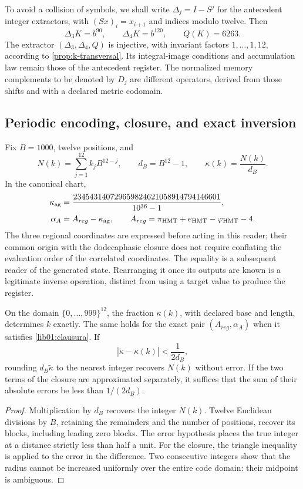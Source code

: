 To avoid a collision of symbols, we shall write \(\Delta_j=I-S^j\) for the antecedent integer extractors, with \((Sx)_i=x_{i+1}\) and indices modulo twelve. Then
\[
 \Delta_3K=b^{90},\qquad \Delta_4K=b^{120},\qquad Q(K)=6263.
\]
The extractor \((\Delta_3,\Delta_4,Q)\) is injective, with invariant factors \(1,\ldots,1,12\), according to \cref{prop:k-transversal}. Its integral-image conditions and accumulation law remain those of the antecedent register. The normalized memory complements to be denoted by \(D_j\) are different operators, derived from those shifts and with a declared metric codomain.

\subsection{Periodic encoding, closure, and exact inversion}
\label{lib01:kappa}

Fix \(B=1000\), twelve positions, and
\[
 N(k)=\sum_{j=1}^{12}k_jB^{12-j},\qquad d_B=B^{12}-1,
 \qquad \kappa(k)=\frac{N(k)}{d_B}.
\]
In the canonical chart,
\begin{equation}
 \begin{aligned}
 \kappa_{\rm ag}
 &=\frac{234543140729659824621058914794146601}{10^{36}-1},\\
 \alpha_A&=A_{reg}-\kappa_{\rm ag},\qquad
 A_{reg}=\pi_{\rm HMT}+e_{\rm HMT}-\varphi_{\rm HMT}-4.
 \end{aligned}
 \label{lib01:clausura}
\end{equation}
The three regional coordinates are expressed before acting in this reader; their common origin with the dodecaphasic closure does not require conflating the evaluation order of the correlated coordinates. The equality is a subsequent reader of the generated state. Rearranging it once its outputs are known is a legitimate inverse operation, distinct from using a target value to produce the register.

\begin{proposition}
\label{lib01:inversion-kappa}
On the domain \(\{0,\ldots,999\}^{12}\), the fraction \(\kappa(k)\), with declared base and length, determines \(k\) exactly. The same holds for the exact pair \((A_{reg},\alpha_A)\) when it satisfies \eqref{lib01:clausura}. If
\[
 |\widetilde\kappa-\kappa(k)|<\frac1{2d_B},
\]
rounding \(d_B\widetilde\kappa\) to the nearest integer recovers \(N(k)\) without error. If the two terms of the closure are approximated separately, it suffices that the sum of their absolute errors be less than \(1/(2d_B)\).
\end{proposition}
\begin{proof}
Multiplication by \(d_B\) recovers the integer \(N(k)\). Twelve Euclidean divisions by \(B\), retaining the remainders and the number of positions, recover its blocks, including leading zero blocks. The error hypothesis places the true integer at a distance strictly less than half a unit. For the closure, the triangle inequality is applied to the error in the difference. Two consecutive integers show that the radius cannot be increased uniformly over the entire code domain: their midpoint is ambiguous.
\end{proof}

